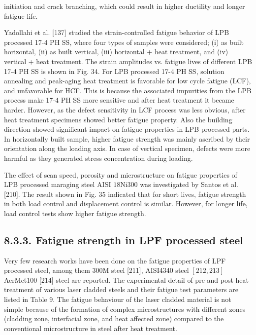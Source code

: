 \documentclass[10pt]{article}
\begin{document}
initiation and crack branching, which could result in higher ductility and longer fatigue life.

Yadollahi et al. [137] studied the strain-controlled fatigue behavior of LPB processed 17-4 PH SS, where four types of samples were considered; (i) as built horizontal, (ii) as built vertical, (iii) horizontal + heat treatment, and (iv) vertical + heat treatment. The strain amplitudes vs. fatigue lives of different LPB 17-4 PH SS is shown in Fig. 34. For LPB processed 17-4 PH SS, solution annealing and peak-aging heat treatment is favorable for low cycle fatigue (LCF), and unfavorable for HCF. This is because the associated impurities from the LPB process make 17-4 PH SS more sensitive and after heat treatment it became harder. However, as the defect sensitivity in LCF process was less obvious, after heat treatment specimens showed better fatigue property. Also the building direction showed significant impact on fatigue properties in LPB processed parts. In horizontally built sample, higher fatigue strength was mainly ascribed by their orientation along the loading axis. In case of vertical specimen, defects were more harmful as they generated stress concentration during loading.

The effect of scan speed, porosity and microstructure on fatigue properties of LPB processed maraging steel AISI $18 \mathrm{Ni300}$ was investigated by Santos et al. [210]. The result shown in Fig. 35 indicated that for short lives, fatigue strength in both load control and displacement control is similar. However, for longer life, load control tests show higher fatigue strength.

\subsection*{8.3.3. Fatigue strength in LPF processed steel}
Very few research works have been done on the fatigue properties of LPF processed steel, among them $300 \mathrm{M}$ steel [211], AISI4340 steel $[212,213]$ AerMet100 [214] steel are reported. The experimental detail of pre and post heat treatment of various laser cladded steels and their fatigue test parameters are listed in Table 9. The fatigue behaviour of the laser cladded material is not simple because of the formation of complex microstructures with different zones (cladding zone, interfacial zone, and heat affected zone) compared to the conventional microstructure in steel after heat treatment.
\end{document}
